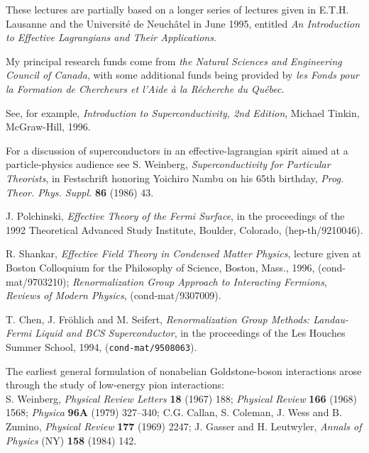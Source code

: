 These lectures are partially based on a longer series of lectures
given in E.T.H. Lausanne and the Universit\'e de
Neuch\^atel in June 1995, entitled 
{\it An Introduction to Effective Lagrangians and Their Applications}. 

My principal research funds come from {\sl the Natural Sciences and 
Engineering Council of Canada}, with some additional funds 
being provided by {\sl les Fonds pour la Formation de Chercheurs 
et l'Aide \`a la R\'echerche du Qu\'ebec}. 

\begin{thebibliography}{99}
%
See, for example, {\it Introduction to Superconductivity, 
2nd Edition}, Michael Tinkin, McGraw-Hill, 1996.

For a discussion of superconductors in an effective-lagrangian
spirit aimed at a particle-physics audience 
see S. Weinberg, {\sl Superconductivity for Particular Theorists},
in Festschrift honoring Yoichiro Nambu on his 65th birthday,
{\it Prog. Theor. Phys. Suppl.} {\bf 86} (1986) 43.

J. Polchinski, {\sl  Effective Theory of the Fermi Surface}, 
in the proceedings of the 1992 Theoretical Advanced Study 
Institute, Boulder, Colorado, (hep-th/9210046).

R. Shankar, {\sl Effective Field Theory in Condensed Matter Physics},
lecture given at Boston Colloquium for the Philosophy of Science,
Boston, Mass., 1996, (cond-mat/9703210);
{\sl Renormalization Group Approach to Interacting Fermions},
{\it Reviews of Modern Physics}, (cond-mat/9307009).

T. Chen, J. Fr\"ohlich and M. Seifert, {\sl Renormalization
Group Methods: Landau-Fermi Liquid and BCS Superconductor},
in the proceedings of the Les Houches Summer School, 1994,
({\tt cond-mat/9508063}).

The earliest general formulation of nonabelian
Goldstone-boson interactions 
arose through the study of low-energy pion interactions:\\
S. Weinberg, {\it Physical Review Letters} {\bf 18} (1967) 188;
{\it Physical Review}  {\bf 166} (1968) 1568; 
{\it Physica} {\bf 96A} (1979) 327--340; 
C.G. Callan, S. Coleman, J. Wess and B. Zumino, {\it Physical Review}
{\bf 177} (1969) 2247;
J. Gasser and H. Leutwyler, 
{\it Annals of Physics} (NY) {\bf 158} (1984) 142.


\end{thebibliography}
